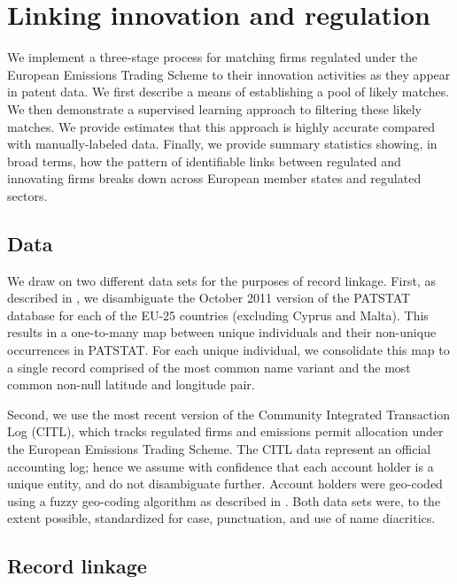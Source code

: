 \documentclass[11pt]{article}
\begin{document}
\section{Linking innovation and regulation}
\label{sec:linking-patstat-citl}

We implement a three-stage process for matching firms regulated under
the European Emissions Trading Scheme to their innovation activities
as they appear in patent data. We first describe a means of
establishing a pool of likely matches. We then demonstrate a supervised
learning approach to filtering these likely matches. We provide
estimates that this approach is highly accurate compared with
manually-labeled data. Finally, we provide summary statistics showing,
in broad terms, how the pattern of identifiable links between
regulated and innovating firms breaks down across European
member states and regulated sectors. 

\subsection{Data}
\label{sec:data}

We draw on two different data sets for the purposes of record
linkage. First, as described in \cite{huberty2013a}, we disambiguate
the October 2011 version of the PATSTAT database for each of the EU-25
countries (excluding Cyprus and Malta). This results in a one-to-many
map between unique individuals and their non-unique occurrences in
PATSTAT. For each unique individual, we consolidate this map to a
single record comprised of the most common name variant and the most
common non-null latitude and longitude pair. 

Second, we use the most recent version of the Community Integrated
Transaction Log (CITL), which tracks regulated firms and emissions
permit allocation under the European Emissions Trading Scheme. The
CITL data represent an official accounting log; hence we assume with
confidence that each account holder is a unique entity, and do not
disambiguate further. Account holders were geo-coded using a fuzzy
geo-coding algorithm as described in \cite{huberty2013a}. Both data
sets were, to the extent possible, standardized for case, punctuation,
and use of name diacritics.

\subsection{Record linkage}
\label{sec:record-linkage}
\end{document}
